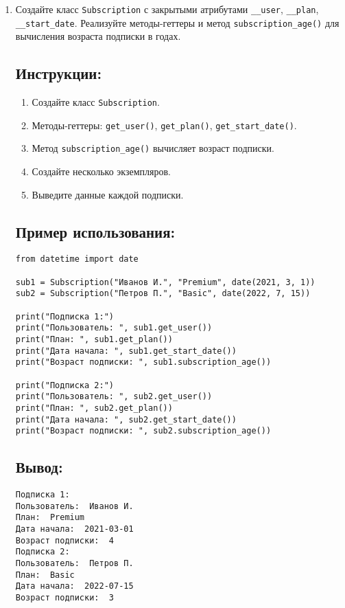 \begin{enumerate}
\item
Создайте класс \texttt{Subscription} с закрытыми атрибутами \texttt{\_\_user}, \texttt{\_\_plan}, \texttt{\_\_start\_date}. Реализуйте методы-геттеры и метод \texttt{subscription\_age()} для вычисления возраста подписки в годах.

\subsection*{Инструкции:}
\begin{enumerate}
    \item Создайте класс \texttt{Subscription}.
    \item Методы-геттеры: \texttt{get\_user()}, \texttt{get\_plan()}, \texttt{get\_start\_date()}.
    \item Метод \texttt{subscription\_age()} вычисляет возраст подписки.
    \item Создайте несколько экземпляров.
    \item Выведите данные каждой подписки.
\end{enumerate}

\subsection*{Пример использования:}
\begin{lstlisting}[caption=Пример кода]
from datetime import date

sub1 = Subscription("Иванов И.", "Premium", date(2021, 3, 1))
sub2 = Subscription("Петров П.", "Basic", date(2022, 7, 15))

print("Подписка 1:")
print("Пользователь: ", sub1.get_user())
print("План: ", sub1.get_plan())
print("Дата начала: ", sub1.get_start_date())
print("Возраст подписки: ", sub1.subscription_age())

print("Подписка 2:")
print("Пользователь: ", sub2.get_user())
print("План: ", sub2.get_plan())
print("Дата начала: ", sub2.get_start_date())
print("Возраст подписки: ", sub2.subscription_age())
\end{lstlisting}

\subsection*{Вывод:}
\begin{lstlisting}[caption=Ожидаемый вывод]
Подписка 1:
Пользователь:  Иванов И.
План:  Premium
Дата начала:  2021-03-01
Возраст подписки:  4
Подписка 2:
Пользователь:  Петров П.
План:  Basic
Дата начала:  2022-07-15
Возраст подписки:  3
\end{lstlisting}


\end{enumerate}
